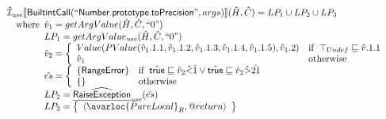 \[\begin{array}{l}
\aI_{\it use}\lbr \SF{BuiltintCall}(``\SF{Number.prototype.toPrecision}",args)\rbr(\hat{H},\hat{C}) = LP_1 \cup LP_2 \cup LP_3\\
\quad\wherec{
  \hat{v}_1 =getArgValue(\hat{H}, \hat{C}, ``0")\\
  LP_1 = getArgValue_{\it use}(\hat{H}, \hat{C}, ``0")\\
  \hat{v}_2 = \left\{\begin{array}{ll}
      Value(PValue(\hat{v}_1.1.1,\hat{v}_1.1.2,\hat{v}_1.1.3,
        \hat{v}_1.1.4,\hat{v}_1.1.5), \hat{v}_1.2)
      & \ifc{\top_{Undef} \sqsubseteq \hat{v}.1.1}\\
      \hat{v}_1 & \owc
    \end{array}\right.\\
  \hat{es} = \left\{\begin{array}{ll}
      \{ \SF{RangeError} \}
      & \ifc{\atrue \sqsubseteq \hat{v}_2 \hat{<} \hat{1} \lor \atrue \sqsubseteq \hat{v}_2 \hat{>} \hat{21}}\\
      \set{} & \owc
    \end{array}\right.\\
  LP_2 = \ahf{RaiseException}_{\it use}(\hat{es})\\
  LP_3 = \set{\langle\avarloc{PureLocal}_R,\varprop{return}\rangle}\\
  }\\
\\

\end{array}
\]

